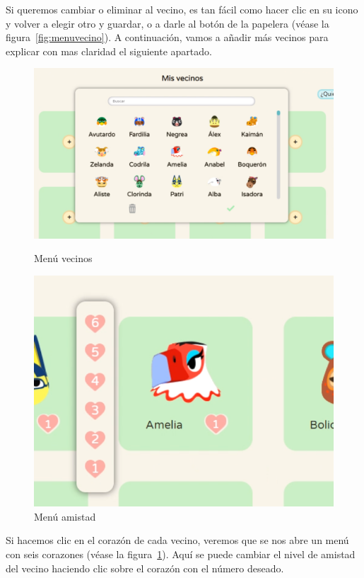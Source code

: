 \clearpage

Si queremos cambiar o eliminar al vecino, es tan fácil como hacer clic en su icono y volver a elegir otro y guardar, o a darle al botón de la papelera {(v\'ease la figura~\ref{fig:menuvecino})}. A continuación, vamos a añadir más vecinos para explicar con mas claridad el siguiente apartado.\\

\begin{figure}[!htb]
	\begin{minipage}{0.48\textwidth}
		\centering
		\includegraphics[width=.9\linewidth]{img/cap9/42-menu-vecinos.png}
		\caption{Menú vecinos}
		\label{fig:menuvecino}
	\end{minipage}\hfill
	\begin{minipage}{0.48\textwidth}
		\centering
		\includegraphics[width=.7\linewidth]{img/cap9/43-menu-amistad.png}
		\caption{Menú amistad}
		\label{fig:menuamistad}
	\end{minipage}
\end{figure}

Si hacemos clic en el corazón de cada vecino, veremos que se nos abre un menú con seis corazones {(v\'ease la figura~\ref{fig:menuamistad})}. Aquí se puede cambiar el nivel de amistad del vecino haciendo clic sobre el corazón con el número deseado.\\

